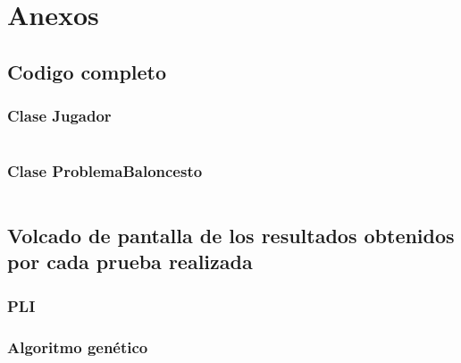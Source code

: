 \documentclass[a4paper,12pt]{article}
\begin{document}
\section{Anexos}
\subsection{Codigo completo}

\subsubsection{Clase Jugador}
\inputminted[fontsize=\footnotesize,breaklines]{java}{src/code/Jugador.java}

\subsubsection{Clase ProblemaBaloncesto}
\inputminted[fontsize=\footnotesize,breaklines]{java}{src/code/ProblemaBaloncesto.java}


\subsection{Volcado de pantalla de los resultados obtenidos por cada prueba realizada}
\subsubsection{PLI}
\subsubsection{Algoritmo genético}
\end{document}
